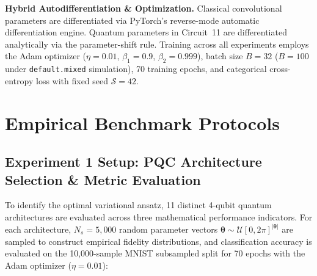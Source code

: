\documentclass[journal]{IEEEtran}
\begin{document}
\textbf{Hybrid Autodifferentiation \& Optimization.} Classical convolutional parameters are differentiated via PyTorch's reverse-mode automatic differentiation engine. Quantum parameters in Circuit~11 are differentiated analytically via the parameter-shift rule. Training across all experiments employs the Adam optimizer ($\eta = 0.01$, $\beta_1 = 0.9$, $\beta_2 = 0.999$), batch size $B = 32$ ($B = 100$ under \texttt{default.mixed} simulation), 70 training epochs, and categorical cross-entropy loss with fixed seed $\mathcal{S}=42$.

\section{Empirical Benchmark Protocols}
\label{sec:protocols}

\subsection{Experiment 1 Setup: PQC Architecture Selection \& Metric Evaluation}
To identify the optimal variational ansatz, 11 distinct 4-qubit quantum architectures are evaluated across three mathematical performance indicators. For each architecture, $N_s = 5{,}000$ random parameter vectors $\boldsymbol{\theta} \sim \mathcal{U}[0, 2\pi]^{|\boldsymbol{\theta}|}$ are sampled to construct empirical fidelity distributions, and classification accuracy is evaluated on the 10,000-sample MNIST subsampled split for 70 epochs with the Adam optimizer ($\eta = 0.01$):
\end{document}
